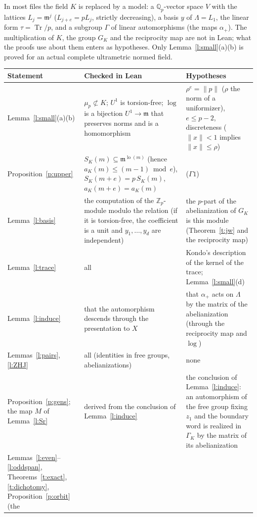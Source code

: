 \documentclass[11pt,a4paper]{article}
\newcommand{\Zp}{\mathbb{Z}_p}
\newcommand{\Qp}{\mathbb{Q}_p}
\newcommand{\fm}{\mathfrak{m}}
\newcommand{\Tr}{\operatorname{Tr}}
\newcommand{\lo}{\operatorname{lo}}
\theoremstyle{plain}
\theoremstyle{definition}
\theoremstyle{remark}
\begin{document}
In most files the field $K$ is replaced by a model: a $\Qp$-vector space $V$ with the lattices $L_j=\fm^j$
($L_{j+e}=pL_j$, strictly decreasing), a basis $y$ of $\Lambda=L_1$, the linear form $\tau=\Tr/p$, and a subgroup
$\Gamma$ of linear automorphisms (the maps $\alpha_+$). The multiplication of $K$, the group $G_K$ and the reciprocity
map are not in Lean; what the proofs use about them enters as hypotheses. Only Lemma~\ref{l:small}(a)(b) is proved for
an actual complete ultrametric normed field.

\begin{table}[p]
\centering\small
\begin{tabular}{@{}>{\raggedright\arraybackslash}p{}>{\raggedright\arraybackslash}p{}>{\raggedright\arraybackslash}p{}@{}}
\toprule
Statement & Checked in Lean & Hypotheses\\
\midrule
Lemma~\ref{l:small}(a)(b) & $\mu_p\not\subset K$; $U^1$ is torsion-free; $\log$ is a bijection $U^1\to\fm$ that preserves
norms and is a homomorphism & $\rho^e=\lVert p\rVert$ ($\rho$ the norm of a uniformizer), $e\le p-2$, discreteness ($\lVert
x\rVert<1$ implies $\lVert x\rVert\le\rho$)\\
Proposition~\ref{p:upper} & $S_K(m)\subseteq\fm^{\lo(m)}$ (hence $a_K(m)\le(m-1)\bmod e$), $S_K(m+e)=p\,S_K(m)$,
$a_K(m+e)=a_K(m)$ & ($\Gamma1$)\\
Lemma~\ref{l:basis} & the computation of the $\Zp$-module modulo the relation (if it is torsion-free, the coefficient is a
unit and $y_1,\dots,y_d$ are independent) & the $p$-part of the abelianization of $G_K$ is this module (Theorem~\ref{t:jw}
and the reciprocity map)\\
Lemma~\ref{l:trace} & all & Kondo's description of the kernel of the trace; Lemma~\ref{l:small}(d)\\
Lemma~\ref{l:induce} & that the automorphism descends through the presentation to $X$ & that $\alpha_+$ acts on
$\Lambda$ by the matrix of the abelianization (through the reciprocity map and $\log$)\\
Lemmas~\ref{l:pairs}, \ref{l:ZHJ} & all (identities in free groups, abelianizations) & none\\
Proposition~\ref{p:gens}; the map $M$ of Lemma~\ref{l:Sr} & derived from the conclusion of Lemma~\ref{l:induce} & the
conclusion of Lemma~\ref{l:induce}: an automorphism of the free group fixing $z_1$ and the boundary word is realized
in $\Gamma_K$ by the matrix of its abelianization\\
Lemmas~\ref{l:even}--\ref{l:oddspan}, Theorems~\ref{t:exact}, \ref{t:dichotomy}, Proposition~\ref{p:orbit} (the

\end{tabular}
\end{table}
\end{document}
